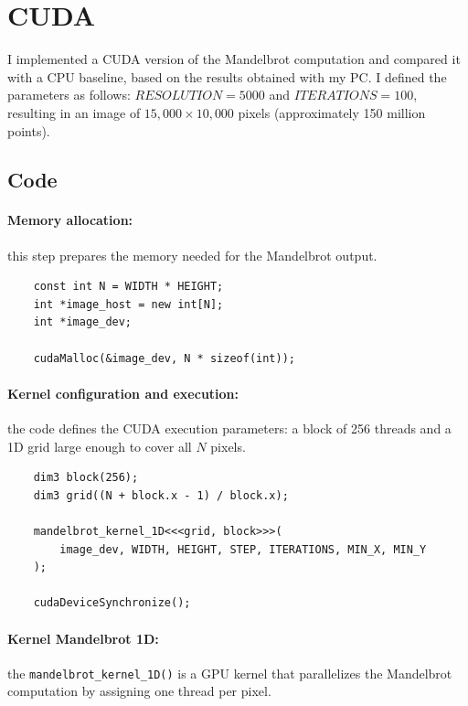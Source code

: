 \newpage
\section{CUDA}
\label{sec:CUDA}
I implemented a CUDA version of the Mandelbrot computation and compared it with a CPU baseline, based on the results obtained with my PC.
\noindent
I defined the parameters as follows: $RESOLUTION = 5000$ and $ITERATIONS = 100$, resulting in an image of $15{,}000 \times 10{,}000$ pixels (approximately 150 million points).

\subsection{Code}

\paragraph{Memory allocation:} this step prepares the memory needed for the Mandelbrot output.
\begin{lstlisting}
    const int N = WIDTH * HEIGHT;
    int *image_host = new int[N];
    int *image_dev;

    cudaMalloc(&image_dev, N * sizeof(int));
\end{lstlisting}

\paragraph{Kernel configuration and execution:} the code defines the CUDA execution parameters: a block of 256 threads and a 1D grid large enough to cover all $N$ pixels.
\begin{lstlisting}
    dim3 block(256);
    dim3 grid((N + block.x - 1) / block.x);

    mandelbrot_kernel_1D<<<grid, block>>>(
        image_dev, WIDTH, HEIGHT, STEP, ITERATIONS, MIN_X, MIN_Y
    );
    
    cudaDeviceSynchronize();
\end{lstlisting}

\paragraph{Kernel Mandelbrot 1D:} the \texttt{mandelbrot\_kernel\_1D()} is a GPU kernel that parallelizes the Mandelbrot computation by assigning one thread per pixel.

